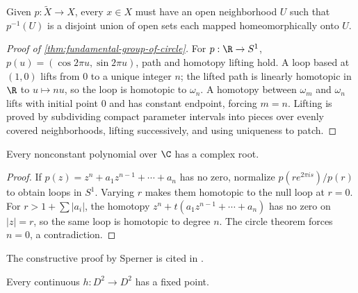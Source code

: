 \begin{definition}
\label{def:covering-space}


Given $p:\widetilde X\to X$, every $x\in X$ must have an open neighborhood
$U$ such that $p^{-1}(U)$ is a disjoint union of open sets each mapped
homeomorphically onto $U$.
\end{definition}

\begin{proof}[Proof of \cref{thm:fundamental-group-of-circle}]
\sketch For $p:\R\to S^1$, $p(u)=(\cos2\pi u,\sin2\pi u)$, path and homotopy
lifting hold. A loop based at $(1,0)$ lifts from $0$ to a unique integer $n$;
the lifted path is linearly homotopic in $\R$ to $u\mapsto nu$, so the loop is
homotopic to $\omega_n$. A homotopy between $\omega_m$ and $\omega_n$ lifts
with initial point $0$ and has constant endpoint, forcing $m=n$. Lifting is
proved by subdividing compact parameter intervals into pieces over evenly
covered neighborhoods, lifting successively, and using uniqueness to patch.
\end{proof}

\begin{theorem}
\label{thm:fundamental-theorem-of-algebra}



Every nonconstant polynomial over $\C$ has a complex root.
\end{theorem}

\begin{proof}
\sketch If $p(z)=z^n+a_1z^{n-1}+\cdots+a_n$ has no zero, normalize
$p(re^{2\pi is})/p(r)$ to obtain loops in $S^1$. Varying $r$ makes them
homotopic to the null loop at $r=0$. For $r>1+\sum|a_i|$, the homotopy
$z^n+t(a_1z^{n-1}+\cdots+a_n)$ has no zero on $|z|=r$, so the same loop is
homotopic to degree $n$. The circle theorem forces $n=0$, a contradiction.
\end{proof}

The constructive proof by Sperner is cited in \cite{AignerZiegler1999}.

\begin{theorem}
\label{thm:brouwer-fixed-point-dim2}



Every continuous $h:D^2\to D^2$ has a fixed point.
\end{theorem}

